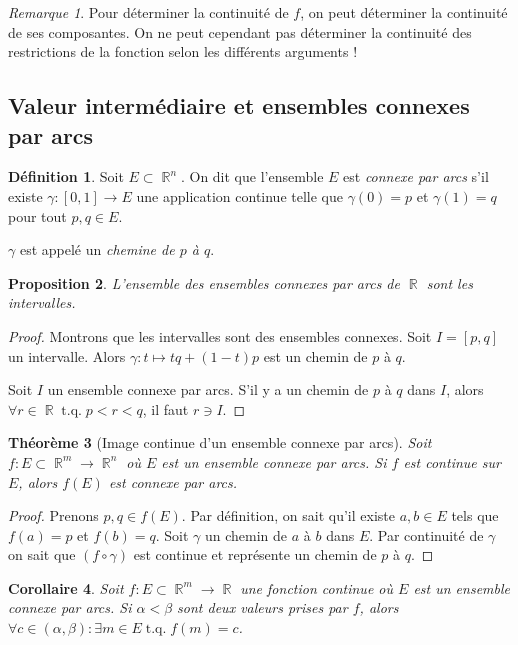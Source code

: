 \documentclass{article}
\DeclareMathOperator{\R}{\mathbb R}
\DeclareMathOperator{\tq}{ t.q. }
\newtheorem{thm}{Théorème}[section]
\newtheorem{prp}[thm]{Proposition}
\newtheorem{cor}[thm]{Corollaire}
\theoremstyle{definition}
\newtheorem{déf}[thm]{Définition}
\theoremstyle{remark}
\newtheorem*{rmq}{Remarque}
\begin{document}
		\begin{rmq} Pour déterminer la continuité de $f$, on peut déterminer la continuité de ses composantes. On ne peut cependant pas déterminer la continuité
		des restrictions de la fonction selon les différents arguments !
		\end{rmq}
	
	\subsection{Valeur intermédiaire et ensembles connexes par arcs}
		\begin{déf} Soit $E \subset \R^n$. On dit que l'ensemble $E$ est \emph{connexe par arcs} s'il existe $\gamma : [0, 1] \to E$ une application continue
		telle que $\gamma(0) = p$ et $\gamma(1) = q$ pour tout $p, q \in E$.

		$\gamma$ est appelé un \emph{chemine de $p$ à $q$}.
		\end{déf}

		\begin{prp} L'ensemble des ensembles connexes par arcs de $\R$ sont les intervalles. \end{prp}

		\begin{proof} Montrons que les intervalles sont des ensembles connexes. Soit $I = [p, q]$ un intervalle. Alors $\gamma : t \mapsto tq + (1-t)p$ est
		un chemin de $p$ à $q$.

		Soit $I$ un ensemble connexe par arcs. S'il y a un chemin de $p$ à $q$ dans $I$, alors $\forall r \in \R \tq p < r < q$, il faut $r \ni I$.
		\end{proof}

		\begin{thm}[Image continue d'un ensemble connexe par arcs]\label{thm:imageconnexepararcs} Soit $f : E \subset \R^m \to \R^n$ où $E$ est un ensemble
		connexe par arcs. Si $f$ est continue sur $E$, alors $f(E)$ est connexe par arcs.
		\end{thm}

		\begin{proof} Prenons $p, q \in f(E)$. Par définition, on sait qu'il existe $a, b \in E$ tels que $f(a) = p$ et $f(b) = q$. Soit $\gamma$ un chemin
		de $a$ à $b$ dans $E$. Par continuité de $\gamma$ on sait que $(f \circ \gamma)$ est continue et représente un chemin de $p$ à $q$.
		\end{proof}

		\begin{cor} Soit $f : E \subset \R^m \to \R$ une fonction continue où $E$ est un ensemble connexe par arcs. Si $\alpha < \beta$ sont deux valeurs
		prises par $f$, alors $\forall c \in (\alpha, \beta) : \exists m \in E \tq f(m) = c$.
		\end{cor}
\end{document}
